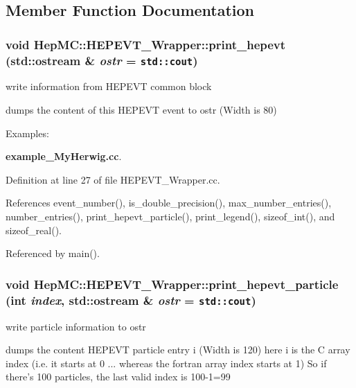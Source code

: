 \subsection{Member Function Documentation}
\subsubsection{\setlength{\rightskip}{0pt plus 5cm}void Hep\-MC::HEPEVT\_\-Wrapper::print\_\-hepevt (std::ostream \& {\em ostr} = {\tt std::cout})\hspace{0.3cm}{\tt  [static]}}\label{classHepMC_1_1HEPEVT__Wrapper_e1d30a37b5de9f6bb8d7be7a886fddfd}


write information from HEPEVT common block 



dumps the content of this HEPEVT event to ostr (Width is 80) \begin{Desc}
\item[Examples: ]\par
{\bf example\_\-My\-Herwig.cc}.\end{Desc}


Definition at line 27 of file HEPEVT\_\-Wrapper.cc.

References event\_\-number(), is\_\-double\_\-precision(), max\_\-number\_\-entries(), number\_\-entries(), print\_\-hepevt\_\-particle(), print\_\-legend(), sizeof\_\-int(), and sizeof\_\-real().

Referenced by main().
\subsubsection{\setlength{\rightskip}{0pt plus 5cm}void Hep\-MC::HEPEVT\_\-Wrapper::print\_\-hepevt\_\-particle (int {\em index}, std::ostream \& {\em ostr} = {\tt std::cout})\hspace{0.3cm}{\tt  [static]}}\label{classHepMC_1_1HEPEVT__Wrapper_d251d1fd071e0235f3d0caa9f93f19de}


write particle information to ostr 



dumps the content HEPEVT particle entry i (Width is 120) here i is the C array index (i.e. it starts at 0 ... whereas the fortran array index starts at 1) So if there's 100 particles, the last valid index is 100-1=99 

